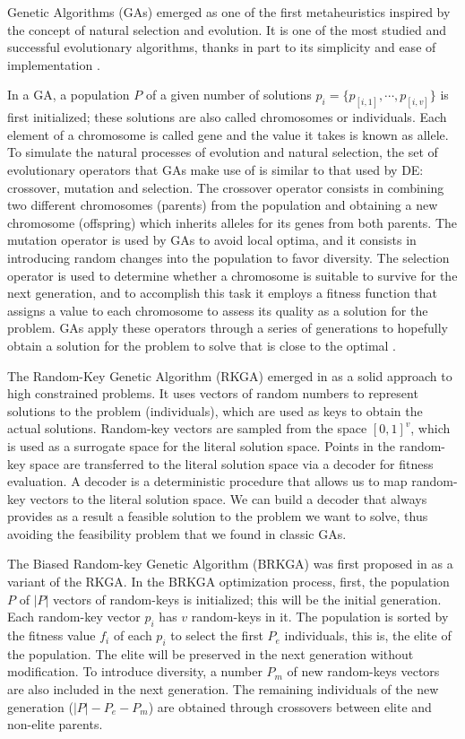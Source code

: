 \documentclass[review]{elsarticle}
\begin{document}
Genetic Algorithms (GAs) emerged as one of the first metaheuristics inspired by the concept of natural selection and evolution. It is one of the most studied and successful evolutionary algorithms, thanks in part to its simplicity and ease of implementation \cite{fausto2019ants, goldberg1989genetic}. 

In a GA, a population $P$ of a given number of solutions $p_i = \{p_{[i,1]}, \cdots, p_{[i,v]}\}$ is first initialized; these solutions are also called chromosomes or individuals. Each element of a chromosome is called gene and the value it takes is known as allele. To simulate the natural processes of evolution and natural selection, the set of evolutionary operators that GAs make use of is similar to that used by DE: crossover, mutation and selection. The crossover operator consists in combining two different chromosomes (parents) from the population and obtaining a new chromosome (offspring) which inherits alleles for its genes from both parents. The mutation operator is used by GAs to avoid local optima, and it consists in introducing random changes into the population to favor diversity. The selection operator is used to determine whether a chromosome is suitable to survive for the next generation, and to accomplish this task it employs a fitness function that assigns a value to each chromosome to assess its quality as a solution for the problem. GAs apply these operators through a series of generations to hopefully obtain a solution for the problem to solve that is close to the optimal \cite{fausto2019ants}.  

The Random-Key Genetic Algorithm (RKGA) emerged in \cite{bean1994genetic} as a solid approach to high constrained problems. It uses vectors of random numbers to represent solutions to the problem (individuals), which are used as keys to obtain the actual solutions. Random-key vectors are sampled from the space $[0,1]^{v}$, which is used as a surrogate space for the literal solution space. Points in the random-key space are transferred to the literal solution space via a decoder for fitness evaluation. A decoder is a deterministic procedure that allows us to map random-key vectors to the literal solution space. We can build a decoder that always provides as a result a feasible solution to the problem we want to solve, thus avoiding the feasibility problem that we found in classic GAs.

The Biased Random-key Genetic Algorithm (BRKGA) was first proposed in \cite{gonccalves2011biased} as a variant of the RKGA. In the BRKGA optimization process, first, the population $P$ of $|P|$ vectors of random-keys is initialized; this will be the initial generation. Each random-key vector $p_i$ has $v$ random-keys in it. The population is sorted by the fitness value $f_i$ of each $p_i$ to select the first $P_e$ individuals, this is, the elite of the population. The elite will be preserved in the next generation without modification. To introduce diversity, a number $P_m$ of new random-keys vectors are also included in the next generation. The remaining individuals of the new generation ($|P| - P_e - P_m$) are obtained through crossovers between elite and non-elite parents.
\end{document}
